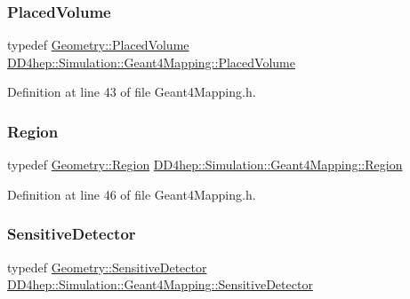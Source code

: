\subsubsection{\texorpdfstring{Placed\+Volume}{PlacedVolume}}
{\footnotesize\ttfamily typedef \hyperlink{class_d_d4hep_1_1_geometry_1_1_placed_volume}{Geometry\+::\+Placed\+Volume} \hyperlink{class_d_d4hep_1_1_simulation_1_1_geant4_mapping_a2cad95da5f969a6b67fb6d6944549ad6}{D\+D4hep\+::\+Simulation\+::\+Geant4\+Mapping\+::\+Placed\+Volume}}



Definition at line 43 of file Geant4\+Mapping.\+h.

\hypertarget{class_d_d4hep_1_1_simulation_1_1_geant4_mapping_a48f9337eb1105d5874835c20456a652d}{}\label{class_d_d4hep_1_1_simulation_1_1_geant4_mapping_a48f9337eb1105d5874835c20456a652d} 
\subsubsection{\texorpdfstring{Region}{Region}}
{\footnotesize\ttfamily typedef \hyperlink{class_d_d4hep_1_1_geometry_1_1_region}{Geometry\+::\+Region} \hyperlink{class_d_d4hep_1_1_simulation_1_1_geant4_mapping_a48f9337eb1105d5874835c20456a652d}{D\+D4hep\+::\+Simulation\+::\+Geant4\+Mapping\+::\+Region}}



Definition at line 46 of file Geant4\+Mapping.\+h.

\hypertarget{class_d_d4hep_1_1_simulation_1_1_geant4_mapping_ae27ee51d13bf8ae59e8bee3fcecdbc85}{}\label{class_d_d4hep_1_1_simulation_1_1_geant4_mapping_ae27ee51d13bf8ae59e8bee3fcecdbc85} 
\subsubsection{\texorpdfstring{Sensitive\+Detector}{SensitiveDetector}}
{\footnotesize\ttfamily typedef \hyperlink{class_d_d4hep_1_1_geometry_1_1_sensitive_detector}{Geometry\+::\+Sensitive\+Detector} \hyperlink{class_d_d4hep_1_1_simulation_1_1_geant4_mapping_ae27ee51d13bf8ae59e8bee3fcecdbc85}{D\+D4hep\+::\+Simulation\+::\+Geant4\+Mapping\+::\+Sensitive\+Detector}}



